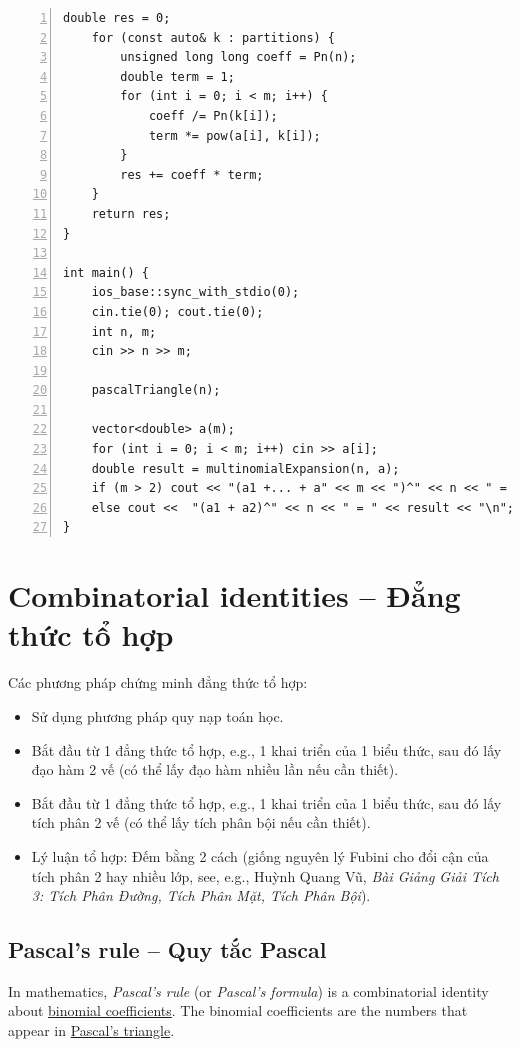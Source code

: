 \documentclass[oneside]{book}
\begin{document}
\begin{enumerate}
\begin{Verbatim}[numbers=left,xleftmargin=5mm]
    double res = 0;
    for (const auto& k : partitions) {
        unsigned long long coeff = Pn(n);
        double term = 1;
        for (int i = 0; i < m; i++) {
            coeff /= Pn(k[i]);
            term *= pow(a[i], k[i]);
        }
        res += coeff * term;
    }
    return res;
}

int main() {
    ios_base::sync_with_stdio(0);
    cin.tie(0); cout.tie(0);
    int n, m;
    cin >> n >> m;
	
    pascalTriangle(n);
	
    vector<double> a(m);
    for (int i = 0; i < m; i++) cin >> a[i];
    double result = multinomialExpansion(n, a);
    if (m > 2) cout << "(a1 +... + a" << m << ")^" << n << " = " << result << "\n";
    else cout <<  "(a1 + a2)^" << n << " = " << result << "\n";
}
	\end{Verbatim}
\end{enumerate}



\section{Combinatorial identities -- Đẳng thức tổ hợp}
Các phương pháp chứng minh đẳng thức tổ hợp:
\begin{itemize}
	\item Sử dụng phương pháp quy nạp toán học.
	\item Bắt đầu từ 1 đẳng thức tổ hợp, e.g., 1 khai triển của 1 biểu thức, sau đó lấy đạo hàm 2 vế (có thể lấy đạo hàm nhiều lần nếu cần thiết).
	\item Bắt đầu từ 1 đẳng thức tổ hợp, e.g., 1 khai triển của 1 biểu thức, sau đó lấy tích phân 2 vế (có thể lấy tích phân bội nếu cần thiết).
	\item Lý luận tổ hợp: Đếm bằng 2 cách (giống nguyên lý Fubini cho đổi cận của tích phân 2 hay nhiều lớp, see, e.g., {\sc Huỳnh Quang Vũ}, {\it Bài Giảng Giải Tích 3: Tích Phân Đường, Tích Phân Mặt, Tích Phân Bội}).
\end{itemize}


\subsection{Pascal's rule -- Quy tắc Pascal}
In mathematics, {\it Pascal's rule} (or {\it Pascal's formula}) is a combinatorial identity about \href{https://en.wikipedia.org/wiki/Binomial_coefficient}{binomial coefficients}. The binomial coefficients are the numbers that appear in \href{https://en.wikipedia.org/wiki/Pascal%27s_triangle}{Pascal's triangle}.
\end{document}
